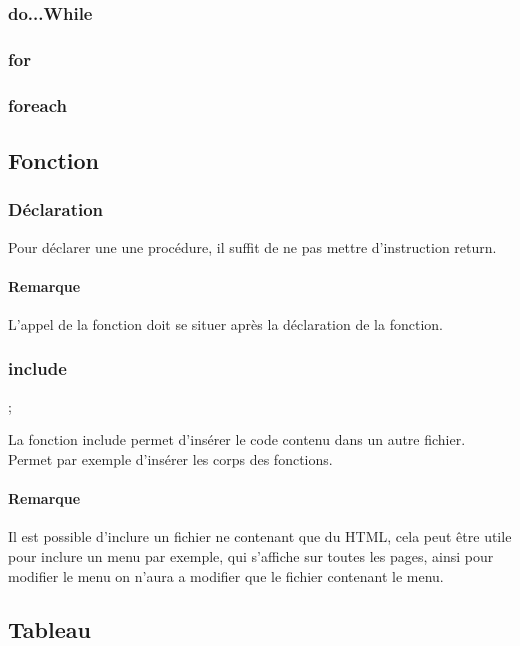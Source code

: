 \documentclass[12pt,a4paper,openany]{article}
\begin{document}
			\subsubsection{do...While}
				
			\subsubsection{for}
				
			\subsubsection{foreach}
				
					
		\subsection{Fonction}
			\subsubsection{Déclaration}
				
				
			Pour déclarer une une procédure, il suffit de ne pas mettre 
			d'instruction return.
			\paragraph{Remarque} L'appel de la fonction doit se situer après la
			déclaration de la fonction.
			\subsubsection{include};
				
			La fonction include permet d'insérer le code contenu dans un autre
			fichier.\\
			Permet par exemple d'insérer les corps des fonctions.\\
			\paragraph{Remarque} Il est possible d'inclure un fichier ne contenant
			que du HTML, cela peut être utile pour inclure un menu par exemple, 
			qui s'affiche sur toutes les pages, ainsi pour modifier le menu on 
			n'aura a modifier que le fichier contenant le menu.
		\subsection{Tableau}
\end{document}

